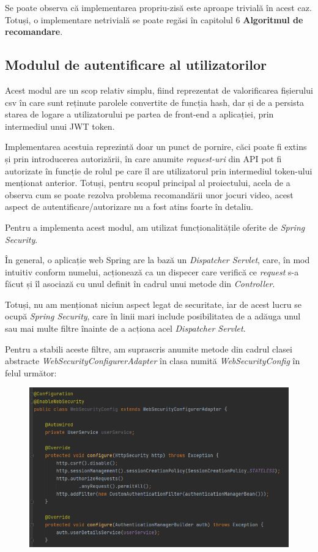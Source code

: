 \documentclass[12pt,a4paper]{report}
\begin{document}
Se poate observa că implementarea propriu-zisă este aproape trivială în acest caz. Totuși, o implementare netrivială se poate regăsi în capitolul 6 \textbf{Algoritmul de recomandare}.





\subsection{Modulul de autentificare al utilizatorilor}


   Acest modul are un scop relativ simplu, fiind reprezentat de valorificarea fișierului csv în care sunt reținute parolele convertite de funcția hash, dar și de a persista starea de logare a utilizatorului pe partea de front-end a aplicației, prin intermediul unui JWT token. \cite{24}

Implementarea acestuia reprezintă doar un punct de pornire, căci poate fi extins și prin introducerea autorizării, în care anumite \emph{request-uri} din API pot fi autorizate în funcție de rolul pe care îl are utilizatorul prin intermediul token-ului menționat anterior. Totuși, pentru scopul principal al proiectului, acela de a observa cum se poate rezolva problema recomandării unor jocuri video, acest aspect de autentificare/autorizare nu a fost atins foarte în detaliu.

Pentru a implementa acest modul, am utilizat funcționalitățile oferite de \emph{Spring Security}. \cite{25}

În general, o aplicație web Spring are la bază un \emph{Dispatcher Servlet}, care, în mod intuitiv conform numelui, acționează ca un dispecer care verifică ce \emph{request} s-a făcut și îl asociază cu unul definit în cadrul unui metode din \emph{Controller}. \cite{26}

Totuși, nu am menționat niciun aspect legat de securitate, iar de acest lucru se ocupă \emph{Spring Security}, care în linii mari include posibilitatea de a adăuga unul sau mai multe filtre înainte de a acționa acel \emph{Dispatcher Servlet}.

Pentru a stabili aceste filtre, am suprascris anumite metode din cadrul clasei abstracte \emph{WebSecurityConfigurerAdapter} în clasa numită \emph{WebSecurityConfig} în felul următor:

\begin{figure}[H]
\centering
\caption{}
\includegraphics[scale = 0.7]{exemplu_23_security}
\caption*{}
\end{figure}
\end{document}
